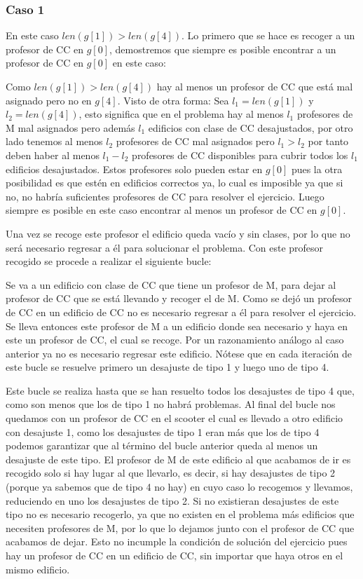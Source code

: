 \documentclass[11pt]{article}
\begin{document}
    \subsubsection{Caso 1}
    En este caso $len(g[1]) > len(g[4])$. Lo primero que se hace es recoger a un profesor de CC en $g[0]$, demostremos que siempre
    es posible encontrar a un profesor de CC en $g[0]$ en este caso:

    Como $len(g[1]) > len(g[4])$ hay al menos un profesor de CC que está mal asignado pero no en $g[4]$. Visto de otra forma:
    Sea $l_1 = len(g[1])$ y $l_2 = len(g[4])$, esto significa que en el problema hay al menos $l_1$ profesores de M mal asignados
    pero además $l_1$ edificios con clase de CC desajustados, por otro lado tenemos al menos $l_2$ profesores de CC mal asignados pero
    $l_1 > l_2$ por tanto deben haber al menos $l_1 - l_2$ profesores de CC disponibles para cubrir todos los $l_1$ edificios desajustados.
    Estos profesores solo pueden estar en $g[0]$ pues la otra posibilidad es que estén en edificios correctos ya, lo cual es imposible
    ya que si no, no habría suficientes profesores de CC para resolver el ejercicio. Luego siempre es posible en este caso encontrar al
    menos un profesor de CC en $g[0]$.

    Una vez se recoge este profesor el edificio queda vacío y sin clases, por lo que no será necesario regresar a él para solucionar el
    problema. Con este profesor recogido se procede a realizar el siguiente bucle:

    Se va a un edificio con clase de CC que tiene un profesor de M, para dejar al profesor de CC que se está llevando y recoger el de M.
    Como se dejó un profesor de CC en un edificio de CC no es necesario regresar a él para resolver el ejercicio. Se lleva entonces este 
    profesor de M a un edificio donde sea necesario y haya en este un profesor de CC, el cual se recoge. Por un razonamiento análogo al 
    caso anterior ya no es necesario regresar este edificio. Nótese que en cada iteración de este bucle se resuelve primero un desajuste 
    de tipo 1 y luego uno de tipo 4.

    Este bucle se realiza hasta que se han resuelto todos los desajustes de tipo 4 que, como son menos que los de tipo 1 no habrá
    problemas. Al final del bucle nos quedamos con un profesor de CC en el scooter el cual es llevado a otro edificio con desajuste
    1, como los desajustes de tipo 1 eran más que los de tipo 4 podemos garantizar que al término del bucle anterior queda al menos
    un desajuste de este tipo. El profesor de M de este edificio al que acabamos de ir es recogido solo si hay lugar al que llevarlo,
    es decir, si hay desajustes de tipo 2 (porque ya sabemos que de tipo 4 no hay) en cuyo caso lo recogemos y llevamos, reduciendo
    en uno los desajustes de tipo 2. Si no existieran desajustes de este tipo no es necesario recogerlo, ya que no existen en el problema
    más edificios que necesiten profesores de M, por lo que lo dejamos junto con el profesor de CC que acabamos de dejar. Esto no incumple
    la condición de solución del ejercicio pues hay un profesor de CC en un edificio de CC, sin importar que haya otros en el mismo edificio.
\end{document}
